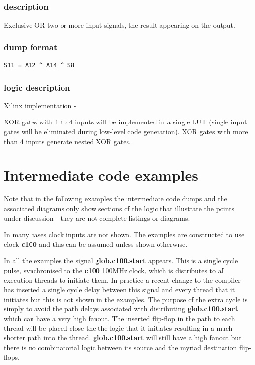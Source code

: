 \documentclass[10pt,a4paper,twoside,fleqn]{book}
\begin{document}
                \subsubsection{description}

                    Exclusive OR two or more input signals, the result appearing
                    on the output.

                \subsubsection{dump format}

                    \begin{lstlisting}[gobble=20, language=tde]
                        S11 = A12 ^ A14 ^ S8
                    \end{lstlisting}

                \subsubsection{logic description}

                    Xilinx implementation -

                    XOR gates with 1 to 4 inputs will be implemented in a
                    single LUT (single input gates will be eliminated during
                    low-level code generation). XOR gates with more than 4 inputs
                    generate nested XOR gates.








    \section{Intermediate code examples}

        Note that in the following examples the intermediate code dumps and the
        associated diagrams only show sections of the logic that illustrate the
        points under discussion - they are not complete listings or diagrams.
        
        In many cases clock inputs are not shown. The examples are constructed
        to use clock {\bf c100} and this can be assumed unless shown otherwise.
        
        In all the examples the signal {\bf glob.c100.start} appears. This is
        a single cycle pulse, synchronised to the {\bf c100} 100MHz clock, which
        is distributes to all execution threads to initiate them. In practice
        a recent change to the compiler has inserted a single cycle delay
        between this signal and every thread that it initiates but this is not
        shown in the examples. The purpose of the extra cycle is simply to avoid
        the path delays associated with distributing {\bf glob.c100.start} which
        can have a very high fanout. The inserted flip-flop in the path to each
        thread will be placed close the the logic that it initiates resulting
        in a much shorter path into the thread. {\bf glob.c100.start} will still
        have a high fanout but there is no combinatorial logic between its
        source and the myriad destination flip-flops.
    
\end{document}
